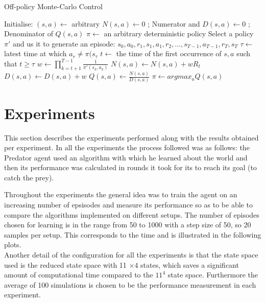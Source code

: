 \documentclass[11pt]{article}
\begin{document}
\begin{algorithm}
\caption{Off-policy Monte-Carlo Control}
\begin{algorithmic}[1]
\label{offpmc}
\STATE Initialise:
\STATE $(s,a) \leftarrow$ arbitrary
\STATE $N(s,a) \leftarrow 0$ \hspace{20mm} ; Numerator and
\STATE $D(s,a) \leftarrow 0$ \hspace{20mm} ; Denominator of $Q(s,a)$
\STATE $\pi \leftarrow$ an arbitrary deterministic policy
\LOOP
\STATE Select a policy $\pi'$ and us it to generate an episode:
\STATE \hspace{20mm} $s_0,a_0,r_1,s_1,a_1,r_2,...,s_{T-1},a_{T-1},r_T,s_T$
\STATE $\tau \leftarrow $ latest time at which $a_r \neq \pi(s_{\tau}$
\STATE $t \leftarrow$ the time of the first occurrence of $s,a$ such that $t \ge \tau$
\STATE $w \leftarrow \prod_{k=t+1}^{T-1} \frac{1}{\pi'(s_k,a_k)}$
\STATE $N(s,a) \leftarrow N(s,a) + wR_t$
\STATE $D(s,a) \leftarrow D(s,a) + w$
\STATE $Q(s,a) \leftarrow \frac{N(s,a)}{D(s,a)}$
\ENDFOR
{}
\STATE $\pi \leftarrow argmax_aQ(s,a)$
\ENDFOR
\ENDLOOP
\ENDFOR
\end{algorithmic}
\end{algorithm}

\section{Experiments}
This section describes the experiments performed along with the results obtained per experiment. In all the experiments the process followed was as follows: the Predator agent used an algorithm with which he learned about the world and then its performance was calculated in rounds it took for its to reach its goal (to catch the prey).

Throughout the experiments the general idea was to train the agent on an increasing number of epsisodes and measure its performance so as to be able to compare the algorithms implemented on different setups. The number of episodes chosen for learning is in the range from 50 to 1000 with a step size of 50, so 20 samples per setup. This corresponds to the time and is illustrated in the following plots.\\
Another detail of the configuration for all the experiments is that the state space used is the reduced state space with 11 $\times4$ states, which saves a significant amount of computational time compared to the $11^4$ state space. Furthermore the average  of 100 simulations is chosen to be the performance measurement in each experiment.
\end{document}
